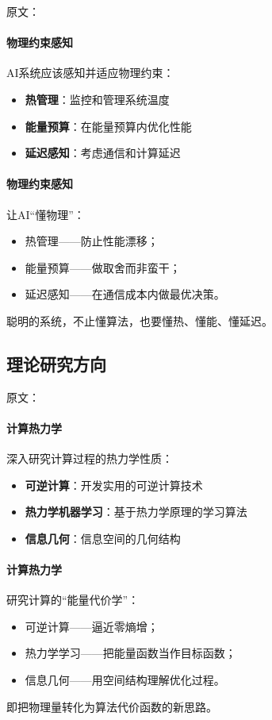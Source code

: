 原文：
\paragraph{物理约束感知}
AI系统应该感知并适应物理约束：
\begin{itemize}
\item \textbf{热管理}：监控和管理系统温度
\item \textbf{能量预算}：在能量预算内优化性能
\item \textbf{延迟感知}：考虑通信和计算延迟
\end{itemize}
\paragraph{物理约束感知}
让AI“懂物理”：
\begin{itemize}
\item 热管理——防止性能漂移；
\item 能量预算——做取舍而非蛮干；
\item 延迟感知——在通信成本内做最优决策。
\end{itemize}
聪明的系统，不止懂算法，也要懂热、懂能、懂延迟。

\subsection{理论研究方向}

原文：
\paragraph{计算热力学}
深入研究计算过程的热力学性质：
\begin{itemize}
\item \textbf{可逆计算}：开发实用的可逆计算技术
\item \textbf{热力学机器学习}：基于热力学原理的学习算法
\item \textbf{信息几何}：信息空间的几何结构
\end{itemize}
\paragraph{计算热力学}
研究计算的“能量代价学”：
\begin{itemize}
\item 可逆计算——逼近零熵增；
\item 热力学学习——把能量函数当作目标函数；
\item 信息几何——用空间结构理解优化过程。
\end{itemize}
即把物理量转化为算法代价函数的新思路。

